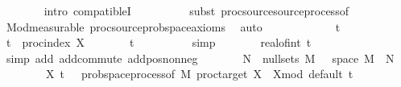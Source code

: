 \begin{isabellebody}
\ \ \ \ \ \ \isamarkupfalse%
\ {\isacharparenleft}{\kern0pt}intro\ compatibleI{\isacharparenright}{\kern0pt}\isanewline
\ \ \ \ \ \ \ \ \isamarkupfalse%
\ {\isacharparenleft}{\kern0pt}subst\ proc{\isacharunderscore}{\kern0pt}source{\isachardot}{\kern0pt}source{\isacharunderscore}{\kern0pt}process{\isacharunderscore}{\kern0pt}of{\isacharparenright}{\kern0pt}\isanewline
\ \ \ \ \ \ \isamarkupfalse%
\ Mod{\isacharunderscore}{\kern0pt}measurable\ proc{\isacharunderscore}{\kern0pt}source{\isachardot}{\kern0pt}prob{\isacharunderscore}{\kern0pt}space{\isacharunderscore}{\kern0pt}axioms\ \isamarkupfalse%
\ auto\isanewline
\ \ \ \ \ \ \isamarkupfalse%
\isanewline
\ \ \ \ \isamarkupfalse%
\ t\ \isamarkupfalse%
\ {\isachardoublequoteopen}t\ {\isasymin}\ proc{\isacharunderscore}{\kern0pt}index\ X{\isachardoublequoteclose}\isanewline
\ \ \ \ \isamarkupfalse%
\ \isamarkupfalse%
\ {\isachardoublequoteopen}t\ {\isasymin}\ {\isacharbraceleft}{\kern0pt}{}{\isachardot}{\kern0pt}{\isachardot}{\kern0pt}{\isacharbraceright}{\kern0pt}{\isachardoublequoteclose}\isanewline
\ \ \ \ \ \ \isamarkupfalse%
\ simp\isanewline
\ \ \ \ \isamarkupfalse%
\ \isamarkupfalse%
\ {\isachardoublequoteopen}real{\isacharunderscore}{\kern0pt}of{\isacharunderscore}{\kern0pt}int\ {\isasymlfloor}t{\isasymrfloor}\ {\isacharplus}{\kern0pt}\ {}\ {\isachargreater}{\kern0pt}\ {}{\isachardoublequoteclose}\isanewline
\ \ \ \ \ \ \isamarkupfalse%
\ {\isacharparenleft}{\kern0pt}simp\ add{\isacharcolon}{\kern0pt}\ add{\isachardot}{\kern0pt}commute\ add{\isacharunderscore}{\kern0pt}pos{\isacharunderscore}{\kern0pt}nonneg{\isacharparenright}{\kern0pt}\isanewline
\ \ \ \ \isamarkupfalse%
\ \isamarkupfalse%
\ {\isachardoublequoteopen}{\isasymexists}N\ {\isasymin}\ null{\isacharunderscore}{\kern0pt}sets\ {\isacharquery}{\kern0pt}M{\isachardot}{\kern0pt}\ {\isasymforall}{\isasymomega}\ {\isasymin}\ space\ {\isacharquery}{\kern0pt}M\ {\isacharminus}{\kern0pt}\ N{\isachardot}{\kern0pt}\ \isanewline
\ \ \ \ \ \ \ \ X\ t\ {\isasymomega}\ {\isacharequal}{\kern0pt}\ {\isacharparenleft}{\kern0pt}prob{\isacharunderscore}{\kern0pt}space{\isachardot}{\kern0pt}process{\isacharunderscore}{\kern0pt}of\ {\isacharquery}{\kern0pt}M\ {\isacharparenleft}{\kern0pt}proc{\isacharunderscore}{\kern0pt}target\ X{\isacharparenright}{\kern0pt}\ {\isacharbraceleft}{\kern0pt}{}{\isachardot}{\kern0pt}{\isachardot}{\kern0pt}{\isacharbraceright}{\kern0pt}\ X{\isacharunderscore}{\kern0pt}mod\ default{\isacharparenright}{\kern0pt}\ t\ {\isasymomega}{\isachardoublequoteclose}\isanewline

\end{isabellebody}
